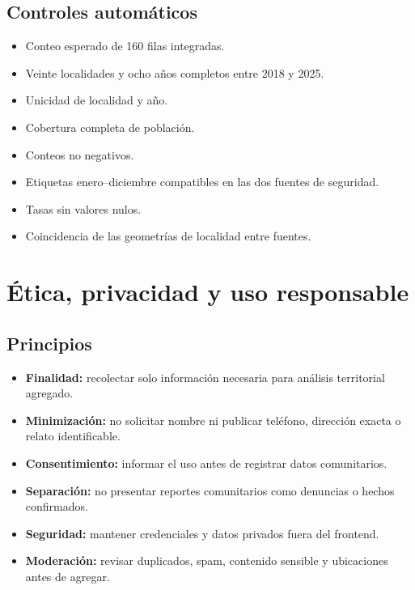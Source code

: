 \documentclass[11pt,letterpaper,oneside]{report}
\begin{document}
\section{Controles automáticos}

\begin{itemize}
  \item Conteo esperado de 160 filas integradas.
  \item Veinte localidades y ocho años completos entre 2018 y 2025.
  \item Unicidad de localidad y año.
  \item Cobertura completa de población.
  \item Conteos no negativos.
  \item Etiquetas enero--diciembre compatibles en las dos fuentes de seguridad.
  \item Tasas sin valores nulos.
  \item Coincidencia de las geometrías de localidad entre fuentes.
\end{itemize}

\chapter{Ética, privacidad y uso responsable}

\section{Principios}

\begin{itemize}
  \item \textbf{Finalidad:} recolectar solo información necesaria para análisis territorial agregado.
  \item \textbf{Minimización:} no solicitar nombre ni publicar teléfono, dirección exacta o relato identificable.
  \item \textbf{Consentimiento:} informar el uso antes de registrar datos comunitarios.
  \item \textbf{Separación:} no presentar reportes comunitarios como denuncias o hechos confirmados.
  \item \textbf{Seguridad:} mantener credenciales y datos privados fuera del frontend.
  \item \textbf{Moderación:} revisar duplicados, spam, contenido sensible y ubicaciones antes de agregar.
\end{itemize}
\end{document}
